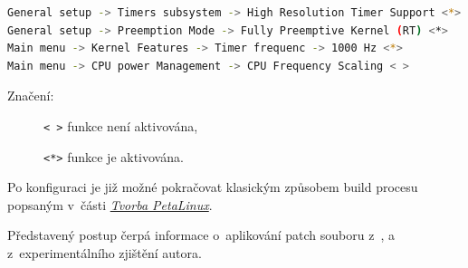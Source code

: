 \documentclass[a4paper, twoside, 11pt]{article}
\begin{document}
				\begin{lstlisting}[language={sh}, caption={Úpravy v~konfiguraci jádra pro RT patch.}, label= {lst:kernel-config-rt-patch}]
General setup -> Timers subsystem -> High Resolution Timer Support <*>
General setup -> Preemption Mode -> Fully Preemptive Kernel (RT) <*>
Main menu -> Kernel Features -> Timer frequenc -> 1000 Hz <*>
Main menu -> CPU power Management -> CPU Frequency Scaling < >\end{lstlisting}

				\noindent Značení:
				\begin{description}
					\item[] \texttt{< >} funkce není aktivována,
					\item[] \texttt{<*>} funkce je aktivována.
				\end{description}

				Po konfiguraci je již možné pokračovat klasickým způsobem build procesu popsaným v~části \hyperref[subsec:tvorba-petalinux]{\textit{Tvorba PetaLinux}}.\par
				Představený postup čerpá informace o~aplikování patch souboru z~\cite{hackster-real-time-optimization-in-petalinux-with-rt-patch-on-mpsoc}, \cite{trenz-electronic-wiki-how-to-install-the-linux-rt} a z~experimentálního zjištění autora.


			
\end{document}
